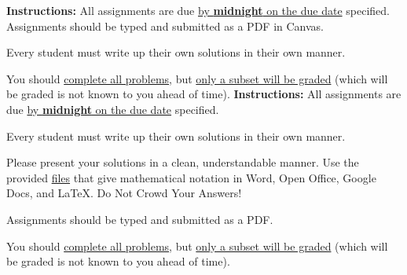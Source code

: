 \newcommand{\CMX}{\text{CMX}}
\newcommand{\ORD}{\text{ORD}}
\newcommand{\DTW}{\text{DTW}}
\newcommand{\MQT}{\text{MQT}}
\newcommand{\MSP}{\text{MSP}}



\extrawidth{0.5in} \extrafootheight{-0in} \pagestyle{headandfoot}
\headrule {} \footrule {}


\ifprintanswers
\noindent \textbf{Instructions:} All assignments are due \underline{by \textbf{midnight} on the due date} specified.  Assignments should be typed and submitted as a PDF in Canvas.   

\medskip
\noindent Every student must write up their own solutions in their own manner.

\medskip
\noindent You should \underline{complete all problems}, but \underline{only a subset will be graded} (which will be graded is not known to you ahead of time). 
\else
\noindent \textbf{Instructions:} All assignments are due \underline{by \textbf{midnight} on the due date} specified.  

\medskip
\noindent Every student must write up their own solutions in their own manner.

\medskip
\noindent Please present your solutions in a clean, understandable
manner.  Use the provided \href{https://mtu.instructure.com/courses/1184060/pages/help-for-typing-hw}{files} that give mathematical notation in Word, Open Office, Google Docs, and \LaTeX.  Do Not Crowd Your Answers!

\medskip
\noindent Assignments should be typed and submitted as a PDF. 

\medskip
\noindent You should \underline{complete all problems}, but \underline{only a subset will be graded} (which will be graded is not known to you ahead of time). 
\fi


